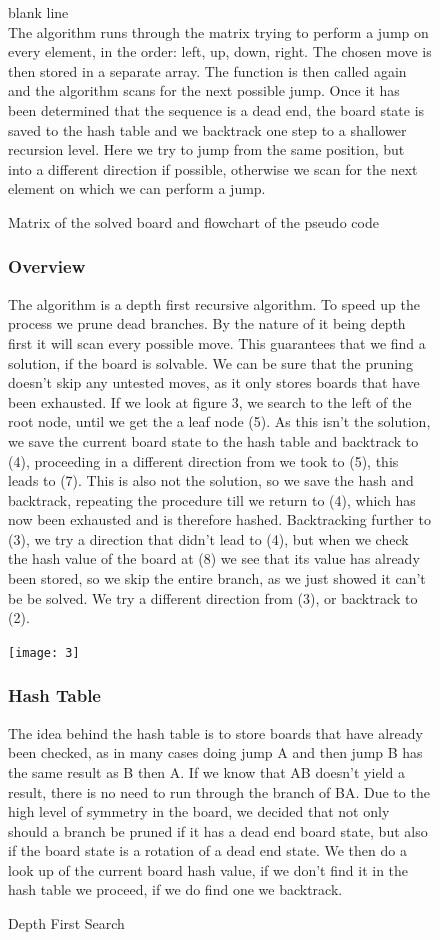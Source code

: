 \documentclass[11pt]{article}
\begin{document}
\begin{figure}
\caption{Matrix of the solved board and flowchart of the pseudo code}
\label{fig:2}
\color{white} blank line\\
\color{black}
The algorithm runs through the matrix trying to perform a jump on every element, in the order: left, up, down, right. The chosen move is then stored in a separate array. The function is then called again and the algorithm scans for the next possible jump. Once it has been determined that the sequence is a dead end, the board state is saved to the hash table and we backtrack one step to a shallower recursion level. Here we try to jump from the same position, but into a different direction if possible, otherwise we scan for the next element on which we can perform a jump.
\end{figure}
\newpage
\begin{figure}
\subsubsection*{Overview}
The algorithm is a depth first recursive algorithm. To speed up the process we prune dead branches. By the nature of it being depth first it will scan every possible move. This guarantees that we find a solution, if the board is solvable. We can be sure that the pruning doesn't skip any untested moves, as it only stores boards that have been exhausted.\newline
If we look at figure 3, we search to the left of the root node, until we get the a leaf node (5). As this isn't the solution, we save the current board state to the hash table and backtrack to (4), proceeding in a different direction from we took to (5), this leads to (7). This is also not the solution, so we save the hash and backtrack, repeating the procedure till we return to (4), which has now been exhausted and is therefore hashed. 
Backtracking further to (3), we try a direction that didn't lead to (4), but when we check the hash value of the board at (8) we see that its value has already been stored, so we skip the entire branch, as we just showed it can't be be solved. We try a different direction from (3), or backtrack to (2).
\newline\\
\begin{center}
\texttt{[image: 3]}
\end{center}\caption{Depth First Search} 
\label{fig: 3}
\subsubsection*{Hash Table}
The idea behind the hash table is to store boards that have already been checked, as in many cases doing jump A and then jump B has the same result as B then A. If we know that AB doesn't yield a result, there is no need to run through the branch of BA.
Due to the high level of symmetry in the board, we decided that not only should a branch be pruned if it has a dead end board state, but also if the board state is a rotation of a dead end state. We then do a look up of the current board hash value, if we don't find it in the hash table we proceed, if we do find one we backtrack.
\end{figure}
\end{document}
